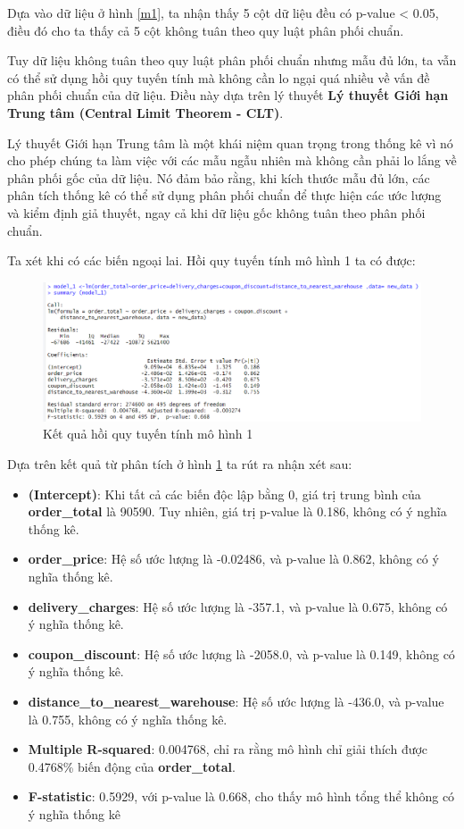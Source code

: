 Dựa vào dữ liệu ở hình \ref{m1}, ta nhận thấy 5 cột dữ liệu đều có p-value < 0.05, điều đó cho ta thấy cả 5 cột không tuân theo quy luật phân phối chuẩn.

Tuy dữ liệu không tuân theo quy luật phân phối chuẩn nhưng mẫu đủ lớn, ta vẫn có thể sử dụng hồi quy tuyến tính mà không cần lo ngại quá nhiều về vấn đề phân phối chuẩn của dữ liệu. Điều này dựa trên lý thuyết \textbf{Lý thuyết Giới hạn Trung tâm (Central Limit Theorem - CLT)}. 

Lý thuyết Giới hạn Trung tâm là một khái niệm quan trọng trong thống kê vì nó cho phép chúng ta làm việc với các mẫu ngẫu nhiên mà không cần phải lo lắng về phân phối gốc của dữ liệu. Nó đảm bảo rằng, khi kích thước mẫu đủ lớn, các phân tích thống kê có thể sử dụng phân phối chuẩn để thực hiện các ước lượng và kiểm định giả thuyết, ngay cả khi dữ liệu gốc không tuân theo phân phối chuẩn.

Ta xét khi có các biến ngoại lai. Hồi quy tuyến tính mô hình 1  ta có được:
\begin{figure}[H]
  \centering
  \includegraphics[width=0.7\linewidth]{graphics/5.5.2.png}
  \caption{Kết quả hồi quy tuyến tính mô hình 1 }
  \label{m2}
\end{figure}

Dựa trên kết quả từ phân tích ở hình \ref{m2} ta rút ra nhận xét sau:
\begin{itemize}
\item \textbf{(Intercept)}: Khi tất cả các biến độc lập bằng 0, giá trị trung bình của \textbf{order\_total} là 90590. Tuy nhiên, giá trị p-value là 0.186, không có ý nghĩa thống kê.
\item \textbf{order\_price}: Hệ số ước lượng là -0.02486, và p-value là 0.862, không có ý nghĩa thống kê.
\item \textbf{delivery\_charges}: Hệ số ước lượng là -357.1, và p-value là 0.675, không có ý nghĩa thống kê.
\item \textbf{coupon\_discount}: Hệ số ước lượng là -2058.0, và p-value là 0.149, không có ý nghĩa thống kê.
\item \textbf{distance\_to\_nearest\_warehouse}: Hệ số ước lượng là -436.0, và p-value là 0.755, không có ý nghĩa thống kê.
\item\textbf{Multiple R-squared}: 0.004768, chỉ ra rằng mô hình chỉ giải thích được 0.4768\% biến động của \textbf{order\_total}.
\item\textbf{F-statistic}: 0.5929, với p-value là 0.668, cho thấy mô hình tổng thể không có ý nghĩa thống kê
\end{itemize}

